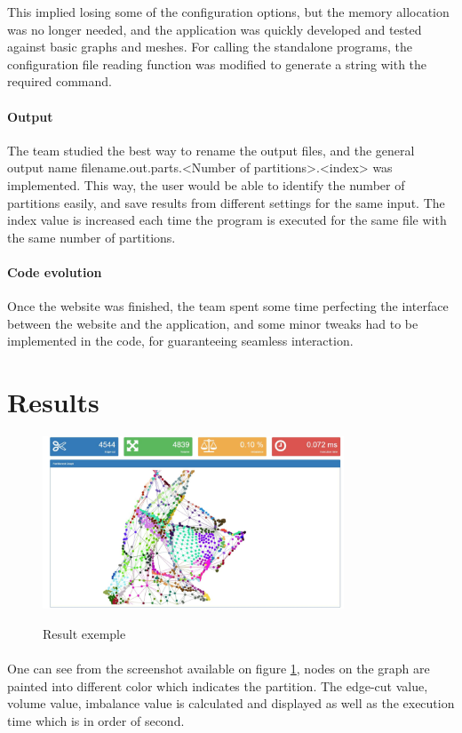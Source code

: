 \documentclass{cranfieldChart}
\begin{document}
This implied losing some of the configuration options, but the memory allocation was no longer needed, and the application was quickly developed and tested against basic graphs and meshes. For calling the standalone programs, the configuration file reading function was modified to generate a string with the required command.

\paragraph{Output}
The team studied the best way to rename the output files, and the general output name filename.out.parts.<Number of partitions>.<index> was implemented. This way, the user would be able to identify the number of partitions easily, and save results from different settings for the same input. The index value is increased each time the program is executed for the same file with the same number of partitions.

\paragraph{Code evolution}
Once the website was finished, the team spent some time perfecting the interface between the website and the application, and some minor tweaks had to be implemented in the code, for guaranteeing seamless interaction.



\section{Results}

\begin{figure}[h!]
\centering
\includegraphics[width=0.8\textwidth]{ressources/graph}
\label{resultexample}
\caption{Result exemple}
\end{figure}

\paragraph{}
One can see from the screenshot available on figure \ref{resultexample}, nodes on the graph are painted into different color which indicates the partition. The edge-cut value, volume value, imbalance value is calculated and displayed as well as the execution time which is in order of second. 
\end{document}
